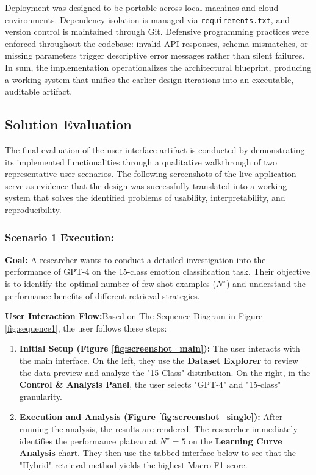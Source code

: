 Deployment was designed to be portable across local machines and cloud environments. Dependency isolation is managed via \texttt{requirements.txt}, and version control is maintained through Git. Defensive programming practices were enforced throughout the codebase: invalid API responses, schema mismatches, or missing parameters trigger descriptive error messages rather than silent failures. In sum, the implementation operationalizes the architectural blueprint, producing a working system that unifies the earlier design iterations into an executable, auditable artifact.

\subsection{Solution Evaluation}
\label{subsec:solution_evaluation}

The final evaluation of the user interface artifact is conducted by demonstrating its implemented functionalities through a qualitative walkthrough of two representative user scenarios. The following screenshots of the live application serve as evidence that the design was successfully translated into a working system that solves the identified problems of usability, interpretability, and reproducibility.

\subsubsection{Scenario 1 Execution:}

\textbf{Goal:} A researcher wants to conduct a detailed investigation into the performance of GPT-4 on the 15-class emotion classification task. Their objective is to identify the optimal number of few-shot examples ($N^\star$) and understand the performance benefits of different retrieval strategies.

\textbf{User Interaction Flow:}Based on The Sequence Diagram in Figure \ref{fig:sequence1}, the user follows these steps:
\begin{enumerate}
    \item \textbf{Initial Setup (Figure \ref{fig:screenshot_main}):} The user interacts with the main interface. On the left, they use the \textbf{Dataset Explorer} to review the data preview and analyze the "15-Class" distribution. On the right, in the \textbf{Control \& Analysis Panel}, the user selects "GPT-4" and "15-class" granularity.
    
    \item \textbf{Execution and Analysis (Figure \ref{fig:screenshot_single}):} After running the analysis, the results are rendered. The researcher immediately identifies the performance plateau at $N^\star=5$ on the \textbf{Learning Curve Analysis} chart. They then use the tabbed interface below to see that the "Hybrid" retrieval method yields the highest Macro F1 score.
\end{enumerate}


